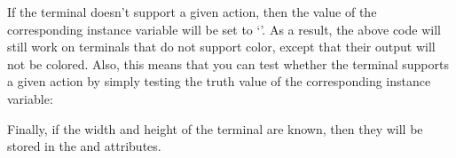 \documentclass[letterpaper,10pt,english]{sphinxmanual}
\begin{document}
\begin{fulllineitems}
\sphinxAtStartPar
If the terminal doesn’t support a given action, then the value of
the corresponding instance variable will be set to ‘’.  As a
result, the above code will still work on terminals that do not
support color, except that their output will not be colored.
Also, this means that you can test whether the terminal supports a
given action by simply testing the truth value of the
corresponding instance variable:

\begin{sphinxVerbatim}[commandchars=\\\{\}]
  
 
     
\end{sphinxVerbatim}

\sphinxAtStartPar
Finally, if the width and height of the terminal are known, then
they will be stored in the  and  attributes.

\begin{fulllineitems}
\label{\detokenize{classes:classes.pyTerminal.TerminalController.BG_BLACK}}
\pysigstartsignatures
{}
\pysigstopsignatures
\end{fulllineitems}


\begin{fulllineitems}
\label{\detokenize{classes:classes.pyTerminal.TerminalController.BG_BLUE}}
\pysigstartsignatures
{}
\pysigstopsignatures
\end{fulllineitems}



\end{fulllineitems}
\end{document}
